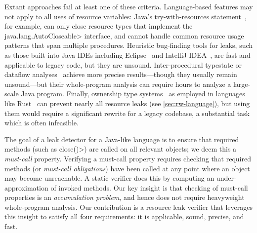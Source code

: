 \noindent
Extant approaches fail at least one of these criteria.
Language-based features may not apply to all uses of resource variables:
Java's try-with-resources statement~\cite{try-with-resources}, for example, can
only close resource types that implement the \<java.lang.AutoCloseable> interface,
and cannot handle
common resource usage patterns that span multiple procedures. 
Heuristic bug-finding tools for leaks, such as those built into Java IDEs including
Eclipse~\cite{ecj-resource-leak} and IntelliJ
IDEA~\cite{idea-resource-leak}, 
are fast and applicable to legacy
code, but they are unsound.
Inter-procedural typestate or dataflow analyses~\cite{TorlakC10,zuo2019grapple}
achieve more precise
results---though they usually remain unsound---but
their whole-program analysis can require hours to analyze a large-scale Java program.
Finally, ownership type
systems~\cite{clarke2013ownership} as employed in languages like
Rust~\cite{klabnik2018rust} can prevent nearly all resource leaks (see
\cref{sec:rw-language}), but using them would require a significant rewrite for
a legacy codebase, a substantial task which is often infeasible.

The goal of a leak detector for a Java-like language is to ensure that required
methods (such as \<close()>) are called on all relevant objects; we deem this
a \emph{must-call} property.  Verifying a must-call property requires
checking that required methods (or \emph{must-call obligations}) have been
called at any point where an object may become unreachable.  A static
verifier does this by computing an
under-approximation of invoked methods.  Our key insight is that checking of
must-call properties is an \emph{accumulation problem}, and hence does not
require heavyweight whole-program analysis. Our contribution is a resource leak
verifier that leverages this insight to satisfy all four requirements: it is
applicable, sound, precise, and fast.

